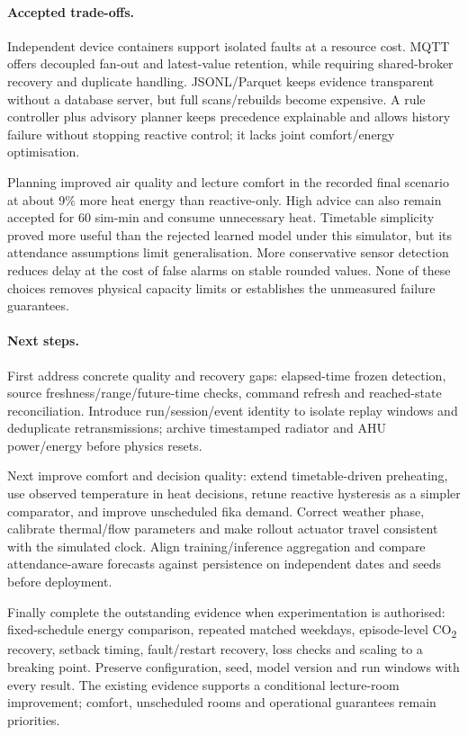 \documentclass[11pt,a4paper]{article}
\begin{document}
\paragraph{Accepted trade-offs.}
Independent device containers support isolated faults at a resource cost. MQTT offers decoupled fan-out and latest-value retention, while requiring shared-broker recovery and duplicate handling. JSONL/Parquet keeps evidence transparent without a database server, but full scans/rebuilds become expensive. A rule controller plus advisory planner keeps precedence explainable and allows history failure without stopping reactive control; it lacks joint comfort/energy optimisation.

Planning improved air quality and lecture comfort in the recorded final scenario at about 9\% more heat energy than reactive-only. High advice can also remain accepted for 60 sim-min and consume unnecessary heat. Timetable simplicity proved more useful than the rejected learned model under this simulator, but its attendance assumptions limit generalisation. More conservative sensor detection reduces delay at the cost of false alarms on stable rounded values. None of these choices removes physical capacity limits or establishes the unmeasured failure guarantees.

\paragraph{Next steps.}
First address concrete quality and recovery gaps: elapsed-time frozen detection, source freshness/range/future-time checks, command refresh and reached-state reconciliation. Introduce run/session/event identity to isolate replay windows and deduplicate retransmissions; archive timestamped radiator and AHU power/energy before physics resets.

Next improve comfort and decision quality: extend timetable-driven preheating, use observed temperature in heat decisions, retune reactive hysteresis as a simpler comparator, and improve unscheduled fika demand. Correct weather phase, calibrate thermal/flow parameters and make rollout actuator travel consistent with the simulated clock. Align training/inference aggregation and compare attendance-aware forecasts against persistence on independent dates and seeds before deployment.

Finally complete the outstanding evidence when experimentation is authorised: fixed-schedule energy comparison, repeated matched weekdays, episode-level CO\textsubscript{2} recovery, setback timing, fault/restart recovery, loss checks and scaling to a breaking point. Preserve configuration, seed, model version and run windows with every result. The existing evidence supports a conditional lecture-room improvement; comfort, unscheduled rooms and operational guarantees remain priorities.
\end{document}
